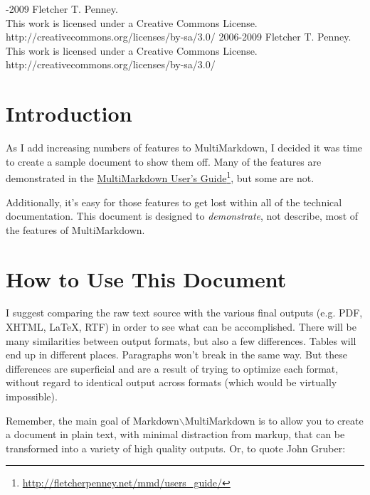 \documentclass[oneside,article]{memoir}
\title{\mytitle}
\author{\myauthor}
\def\revision{}
\def\mycopyright{2006-2009 Fletcher T. Penney. \\ This work is licensed under a Creative Commons License. \\ http://creativecommons.org/licenses/by-sa/3.0/}
\begin{document}
\mainmatter

\maketitle

\setlength{\parindent}{0pt}

\ifx\mycopyright\undefined
\else
	\textcopyright{} \mycopyright
\fi

\revision

\setlength{\parindent}{1em}

%
%


\setlength{\parindent}{1em}

\chapter{Introduction}
\label{introduction}

As I add increasing numbers of features to MultiMarkdown, I decided it was
time to create a sample document to show them off. Many of the features are
demonstrated in the \href{http://fletcherpenney.net/mmd/users_guide/}{MultiMarkdown User's Guide}\footnote{\href{http://fletcherpenney.net/mmd/users_guide/}{http://fletcherpenney.net/mmd/users\_guide/}}, but some are not.


Additionally, it's easy for those features to get lost within all of the
technical documentation. This document is designed to {\itshape demonstrate}, not
describe, most of the features of MultiMarkdown.


\chapter{How to Use This Document}
\label{howtousethisdocument}

I suggest comparing the raw text source with the various final outputs (e.g.
PDF, XHTML, LaTeX, RTF) in order to see what can be accomplished. There will
be many similarities between output formats, but also a few differences.
Tables will end up in different places. Paragraphs won't break in the same
way. But these differences are superficial and are a result of trying to
optimize each format, without regard to identical output across formats (which
would be virtually impossible).


Remember, the main goal of Markdown$\backslash$MultiMarkdown is to allow you to create a
document in plain text, with minimal distraction from markup, that can be
transformed into a variety of high quality outputs. Or, to quote John Gruber:
\end{document}
